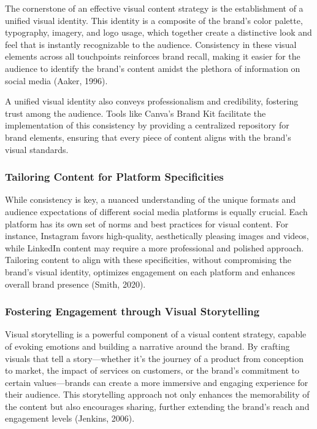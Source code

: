 \documentclass[
]{book}
\begin{document}
The cornerstone of an effective visual content strategy is the establishment of a unified visual identity. This identity is a composite of the brand's color palette, typography, imagery, and logo usage, which together create a distinctive look and feel that is instantly recognizable to the audience. Consistency in these visual elements across all touchpoints reinforces brand recall, making it easier for the audience to identify the brand's content amidst the plethora of information on social media (Aaker, 1996).

A unified visual identity also conveys professionalism and credibility, fostering trust among the audience. Tools like Canva's Brand Kit facilitate the implementation of this consistency by providing a centralized repository for brand elements, ensuring that every piece of content aligns with the brand's visual standards.

\hypertarget{tailoring-content-for-platform-specificities}{%
\subsubsection*{Tailoring Content for Platform Specificities}\label{tailoring-content-for-platform-specificities}}

While consistency is key, a nuanced understanding of the unique formats and audience expectations of different social media platforms is equally crucial. Each platform has its own set of norms and best practices for visual content. For instance, Instagram favors high-quality, aesthetically pleasing images and videos, while LinkedIn content may require a more professional and polished approach. Tailoring content to align with these specificities, without compromising the brand's visual identity, optimizes engagement on each platform and enhances overall brand presence (Smith, 2020).

\hypertarget{fostering-engagement-through-visual-storytelling}{%
\subsubsection*{Fostering Engagement through Visual Storytelling}\label{fostering-engagement-through-visual-storytelling}}

Visual storytelling is a powerful component of a visual content strategy, capable of evoking emotions and building a narrative around the brand. By crafting visuals that tell a story---whether it's the journey of a product from conception to market, the impact of services on customers, or the brand's commitment to certain values---brands can create a more immersive and engaging experience for their audience. This storytelling approach not only enhances the memorability of the content but also encourages sharing, further extending the brand's reach and engagement levels (Jenkins, 2006).
\end{document}
